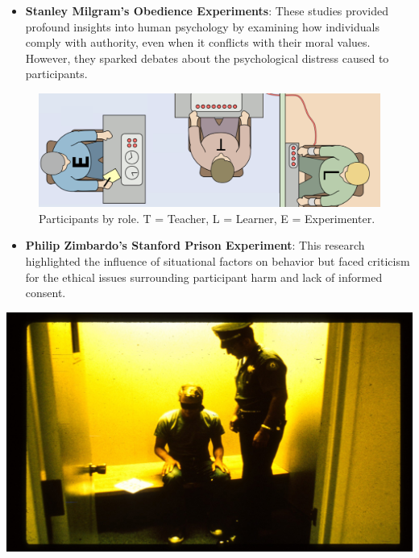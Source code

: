 \documentclass[
]{book}
\providecommand{\tightlist}{%
  \setlength{\itemsep}{0pt}\setlength{\parskip}{0pt}}
\begin{document}
\begin{itemize}
\tightlist
\item
  \textbf{Stanley Milgram's Obedience Experiments}: These studies provided profound insights into human psychology by examining how individuals comply with authority, even when it conflicts with their moral values. However, they sparked debates about the psychological distress caused to participants.
\end{itemize}

\begin{figure}
\centering
\includegraphics[width=1\linewidth,height=\textheight,keepaspectratio]{images/milgram_experiment.png}
\caption{Participants by role. T = Teacher, L = Learner, E = Experimenter.}
\end{figure}

\begin{itemize}
\tightlist
\item
  \textbf{Philip Zimbardo's Stanford Prison Experiment}: This research highlighted the influence of situational factors on behavior but faced criticism for the ethical issues surrounding participant harm and lack of informed consent.
\end{itemize}

\href{https://www.prisonexp.org/}{\includegraphics[width=1\linewidth,height=\textheight,keepaspectratio]{images/police-blindfolding.jpg}}
\end{document}
